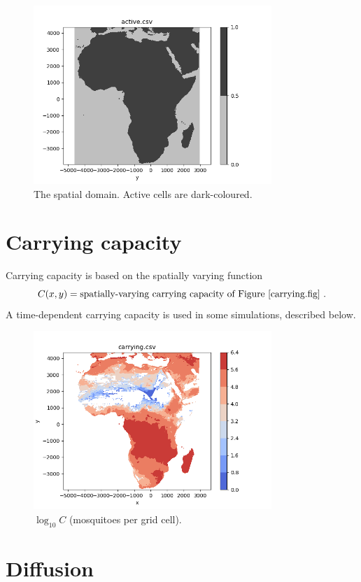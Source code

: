 \documentclass{article}
\begin{document}
\begin{figure}[htb]
  \centering
  \includegraphics[width=9cm]{active.png}
  \caption{\label{active_inactive.fig}The spatial domain.  Active cells are dark-coloured.}
\end{figure}

\section{Carrying capacity}

Carrying capacity is based on the spatially varying function
\begin{equation}
  C(x,y) = \mbox{spatially-varying carrying capacity of Figure~\ref{carrying.fig}} \ .
\end{equation}
A time-dependent carrying capacity is used in some simulations, described below.

\begin{figure}[htb]
  \centering
  \includegraphics[width=9cm]{carrying.png}
  \caption{\label{carrying.fig}$\log_{10}C$ (mosquitoes per grid cell).}
\end{figure}

\section{Diffusion}
\end{document}
